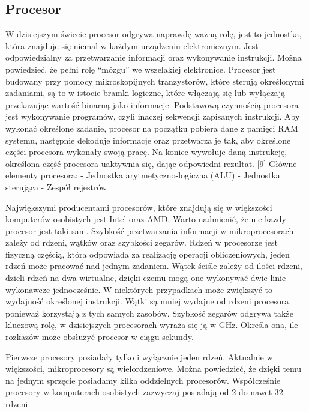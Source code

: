 \documentclass[12pt, a4paper, onside, polish]{article}				%
\begin{document}
\subsection{Procesor}
\hspace{\parindent}
W dzisiejszym świecie procesor odgrywa naprawdę ważną rolę, jest to jednostka, która znajduje się niemal w każdym urządzeniu elektronicznym. Jest odpowiedzialny za przetwarzanie informacji oraz wykonywanie instrukcji. Można powiedzieć, że pełni rolę “mózgu” we wszelakiej elektronice. Procesor jest budowany przy pomocy mikroskopijnych tranzystorów, które sterują określonymi zadaniami, są to w istocie bramki logiczne, które włączają się lub wyłączają przekazując wartość binarną jako informacje. Podstawową czynnością procesora jest wykonywanie programów, czyli inaczej sekwencji zapisanych instrukcji. Aby wykonać określone zadanie, procesor na początku pobiera dane z pamięci RAM systemu, następnie dekoduje informacje oraz przetwarza je tak, aby określone części procesora wykonały swoją pracę. Na koniec wywołuje daną instrukcję, określona część procesora uaktywnia się, dając odpowiedni rezultat. [9]
\newline\newline
Główne elementy procesora:  
\newline
- Jednostka arytmetyczno-logiczna (ALU) \newline
- Jednostka sterująca \newline
- Zespół rejestrów \newline

 
	Największymi producentami procesorów, które znajdują się w większości komputerów osobistych jest Intel oraz AMD. Warto nadmienić, że nie każdy procesor jest taki sam. Szybkość przetwarzania informacji w mikroprocesorach zależy od rdzeni, wątków oraz szybkości zegarów.  
Rdzeń w procesorze jest fizyczną częścią, która odpowiada za realizację operacji obliczeniowych, jeden rdzeń może pracować nad jednym zadaniem. Wątek ściśle zależy od ilości rdzeni, dzieli rdzeń na dwa wirtualne, dzięki czemu mogą one wykonywać dwie linie wykonawcze jednocześnie. W niektórych przypadkach może zwiększyć to wydajność określonej instrukcji. Wątki są mniej wydajne od rdzeni procesora, ponieważ korzystają z tych samych zasobów. Szybkość zegarów odgrywa także kluczową rolę, w dzisiejszych procesorach wyraża się ją w GHz. Określa ona, ile rozkazów może obsłużyć procesor w ciągu sekundy. 

Pierwsze procesory posiadały tylko i wyłącznie jeden rdzeń. Aktualnie w większości, mikroprocesory są wielordzeniowe. Można powiedzieć, że dzięki temu na jednym sprzęcie posiadamy kilka oddzielnych procesorów. Współcześnie procesory w komputerach osobistych zazwyczaj posiadają od 2 do nawet 32 rdzeni. 
\end{document}
